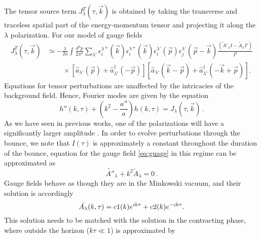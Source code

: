 \documentclass[12pt,a4paper]{article}
\numberwithin{equation}{section}
\numberwithin{equation}{section}
\begin{document}
The tensor source term $J_{\lambda}^T (\tau,\Vec{k})$ is obtained by taking the transverse and traceless spatial part of the energy-momentum tensor and projecting it along the $\lambda$ polarization. For our model of gauge fields \cite{r3}
\begin{equation}
\begin{split}
J_{\lambda}^T (\tau,\Vec{k}) &\simeq -\frac{1}{2 a}\int \frac{d^3p}{2\pi^3} \sum_{\lambda'} \epsilon_i^{\lambda*}(\vec{k}) \epsilon_i^{\lambda*}(\vec{k})
\epsilon_i^{\lambda'}(\vec{p})\epsilon_j^{\lambda'}(\vec{p}-\vec{k}) \frac{\left(\tilde{A}'_{\lambda} I -\tilde{A}_{\lambda} I'\right)}{I^2}\\
&\;\;\;\;\;\;\;\; \times \left[ \hat{a}_{\lambda'}(\vec{p})+\hat{a}^{\dagger}_{\lambda'}(-\vec{p})\right]\left[ \hat{a}_{\lambda'}(\vec{k}-\vec{p})+\hat{a}^{\dagger}_{\lambda'}(-\vec{k}+\vec{p})\right].
\end{split}
\label{eq:tensource}
\end{equation}
Equations for tensor perturbations are unaffected by the intricacies of the background field. Hence, Fourier modes are given by the equation 
\begin{equation}
      h''(k,\tau)+\left( k^2-\frac{a''}{a} \right) h(k,\tau) = J_{\lambda} (\tau,\Vec{k}) \, .
    \label{eq:muksasts}
\end{equation}
As we have seen in previous works, one of the polarizations will have a significantly larger amplitude \cite{r3}.
In order to evolve perturbations through the bounce, we note that $I(\tau)$ is approximately a constant throughout the duration of the bounce, equation for the gauge field \eqref{eq:guage} in this regime can be approximated as 
\begin{equation}
\tilde{A''}_{\lambda}+k^2 \tilde{A}_{\lambda} = 0 \,  \label{eq:guageb}.
\end{equation}
Gauge fields behave as though they are in the Minkowski vacuum, and their solution is accordingly
\begin{equation}
     \Tilde{A_{\lambda}}(k,\tau) = c1(k) e^{ik\tau} + c2(k) e^{-ik\tau}.
\end{equation}
This solution needs to be matched with the solution in the contracting phase, where outside the horizon ($k\tau \ll 1$) is approximated by \cite{r3} 
\end{document}
